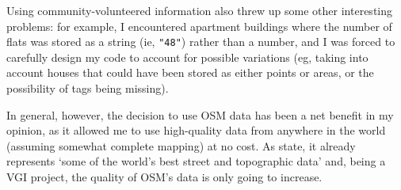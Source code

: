 \documentclass[12pt]{article} %
\begin{document}
Using community-volunteered information also threw up some other interesting problems: for example, I encountered apartment buildings where the number of flats was stored as a string (ie, \texttt{"48"}) rather than a number, and I was forced to carefully design my code to account for possible variations (eg, taking into account houses that could have been stored as either points or areas, or the possibility of tags being missing).

In general, however, the decision to use OSM data has been a net benefit in my opinion, as it allowed me to use high-quality data from anywhere in the world (assuming somewhat complete mapping) at no cost. As \cite{Mooney2017} state, it already represents `some of the world's best street and topographic data' and, being a VGI project, the quality of OSM's data is only going to increase.


\printbibliography
\end{document}
